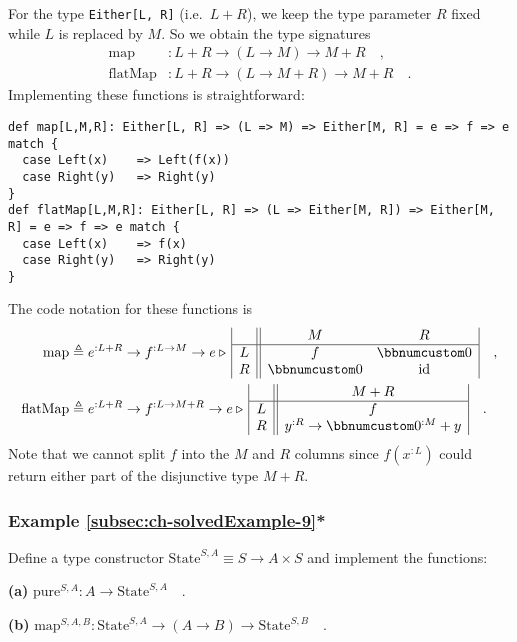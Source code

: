 For the type \lstinline!Either[L, R]! (i.e.~$L+R$), we keep the
type parameter $R$ fixed while $L$ is replaced by $M$. So we obtain
the type signatures
\begin{align*}
\text{map} & :L+R\rightarrow(L\rightarrow M)\rightarrow M+R\quad,\\
\text{flatMap} & :L+R\rightarrow(L\rightarrow M+R)\rightarrow M+R\quad.
\end{align*}
Implementing these functions is straightforward:
\begin{lstlisting}
def map[L,M,R]: Either[L, R] => (L => M) => Either[M, R] = e => f => e match {
  case Left(x)    => Left(f(x))
  case Right(y)   => Right(y)
}
def flatMap[L,M,R]: Either[L, R] => (L => Either[M, R]) => Either[M, R] = e => f => e match {
  case Left(x)    => f(x)
  case Right(y)   => Right(y)
}
\end{lstlisting}
The code notation for these functions is
\begin{align*}
\text{map} & \triangleq e^{:L+R}\rightarrow f^{:L\rightarrow M}\rightarrow e\triangleright\,\begin{array}{|c||cc|}
 & M & R\\
\hline L & f & \bbnum 0\\
R & \bbnum 0 & \text{id}
\end{array}\quad,\\
\text{flatMap} & \triangleq e^{:L+R}\rightarrow f^{:L\rightarrow M+R}\rightarrow e\triangleright\,\begin{array}{|c||c|}
 & M+R\\
\hline L & f\\
R & y^{:R}\rightarrow\bbnum 0^{:M}+y
\end{array}\quad.
\end{align*}
Note that we cannot split $f$ into the $M$ and $R$ columns since
$f(x^{:L})$ could return either part of the disjunctive type $M+R$.

\subsubsection{Example \label{subsec:ch-solvedExample-9}\ref{subsec:ch-solvedExample-9}{*}}

Define a type constructor $\text{State}^{S,A}\equiv S\rightarrow A\times S$
and implement the functions:

\textbf{(a)} $\text{pure}^{S,A}:A\rightarrow\text{State}^{S,A}\quad.$

\textbf{(b)} $\text{map}^{S,A,B}:\text{State}^{S,A}\rightarrow(A\rightarrow B)\rightarrow\text{State}^{S,B}\quad.$

